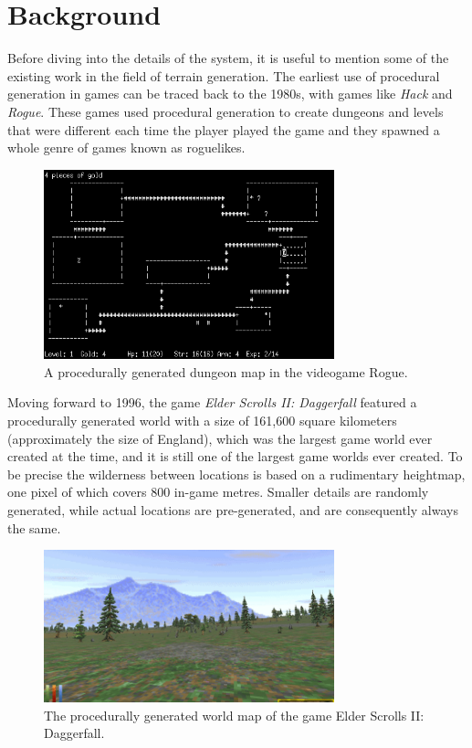 \documentclass{article}
\begin{document}
\section{Background}
Before diving into the details of the system, it is useful to mention some of the existing work in
the field of terrain generation. The earliest use of procedural generation in games can be traced
back to the 1980s, with games like \textit{Hack} and \textit{Rogue}. These games used procedural
generation to create dungeons and levels that were different each time the player played the game
and they spawned a whole genre of games known as roguelikes.

\begin{figure}[H]
	\centering
	\includegraphics[width=0.75\textwidth]{img/rogue.png}
	\caption{A procedurally generated dungeon map in the videogame Rogue.}
	\label{fig:nethack}
\end{figure}

Moving forward to 1996, the game \textit{Elder Scrolls II: Daggerfall} featured a procedurally
generated world with a size of 161,600 square kilometers (approximately the size of England), which
was the largest game world ever created at the time, and it is still one of the largest game worlds
ever created. To be precise the wilderness between locations is based on a rudimentary heightmap,
one pixel of which covers 800 in-game metres. Smaller details are randomly generated, while actual
locations are pre-generated, and are consequently always the same.

\begin{figure}[H]
	\centering
	\includegraphics[width=0.75\textwidth]{img/daggerfall.png}
	\caption{The procedurally generated world map of the game Elder Scrolls II: Daggerfall.}
	\label{fig:daggerfall}
\end{figure}
\end{document}
